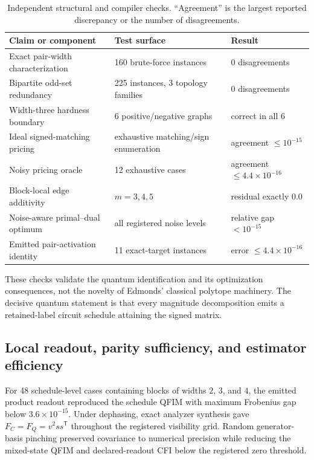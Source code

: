 \documentclass[11pt]{article}
\theoremstyle{definition}
\theoremstyle{remark}
\begin{document}
\begin{table}[H]
\centering
\caption{Independent structural and compiler checks. ``Agreement'' is the largest reported discrepancy or the number of disagreements.}
\label{tab:structural-validation}
\small
\begin{tabularx}{\textwidth}{p{}p{}X}
\toprule
Claim or component & Test surface & Result\\
\midrule
Exact pair-width characterization & 160 brute-force instances & 0 disagreements\\
Bipartite odd-set redundancy & 225 instances, 3 topology families & 0 disagreements\\
Width-three hardness boundary & 6 positive/negative graphs & correct in all 6\\
Ideal signed-matching pricing & exhaustive matching/sign enumeration & agreement $\le10^{-15}$\\
Noisy pricing oracle & 12 exhaustive cases & agreement $\le4.4\times10^{-16}$\\
Block-local edge additivity & $m=3,4,5$ & residual exactly $0.0$\\
Noise-aware primal--dual optimum & all registered noise levels & relative gap $<10^{-15}$\\
Emitted pair-activation identity & 11 exact-target instances & error $\le4.4\times10^{-16}$\\
\bottomrule
\end{tabularx}
\end{table}

These checks validate the quantum identification and its optimization consequences, not the novelty of Edmonds' classical polytope machinery. The decisive quantum statement is that every magnitude decomposition emits a retained-label circuit schedule attaining the signed matrix.

\subsection{Local readout, parity sufficiency, and estimator efficiency}
For 48 schedule-level cases containing blocks of widths $2$, $3$, and $4$, the emitted product readout reproduced the schedule QFIM with maximum Frobenius gap below $3.6\times10^{-15}$. Under dephasing, exact analyzer synthesis gave $F_C=F_Q=v^2ss^{\mathsf T}$ throughout the registered visibility grid. Random generator-basis pinching preserved covariance to numerical precision while reducing the mixed-state QFIM and declared-readout CFI below the registered zero threshold.
\end{document}

